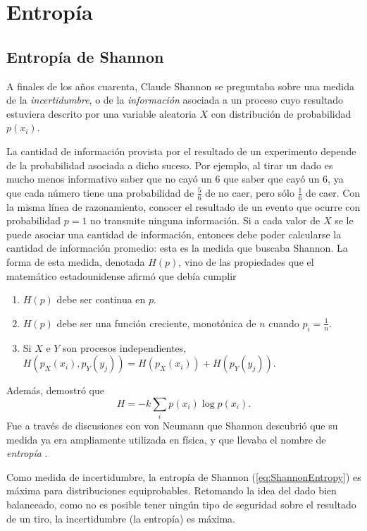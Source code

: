 \section{Entropía}
\subsection{Entropía de Shannon}
A finales de los años cuarenta, Claude Shannon se preguntaba sobre una medida de la \textit{incertidumbre}, o de la \textit{información} asociada a un proceso cuyo resultado estuviera descrito por una variable aleatoria $X$ con distribución de probabilidad $p(x_{i})$.


La cantidad de información provista por el resultado de un experimento depende de la probabilidad asociada a dicho suceso. Por ejemplo, al tirar un dado es mucho menos informativo saber que no cayó un $6$ que saber que cayó un $6$, ya que cada número tiene una probabilidad de $\frac{5}{6}$ de no caer, pero sólo $\frac{1}{6}$ de caer. Con la misma línea de razonamiento, conocer el resultado de un evento que ocurre con probabilidad $p=1$ no transmite ninguna información. Si a cada valor de $X$ se le puede asociar una cantidad de información, entonces debe poder calcularse la cantidad de información promedio: esta es la medida que buscaba Shannon. La forma de esta medida, denotada $H(p)$, vino de las propiedades que el matemático estadounidense afirmó que debía cumplir \cite{Shannon,Wilde}
\begin{enumerate}
    \item $H(p)$ debe ser continua en $p$.
    \item $H(p)$ debe ser una función creciente, monotónica de $n$ cuando $p_{i}=\frac{1}{n}$.
    \item Si $X$ e $Y$ son procesos independientes, $H(p_{X}(x_{i}),p_{Y}(y_{j}))=H(p_{X}(x_{i}))+H(p_{Y}(y_{j}))$.
\end{enumerate}
Además, demostró que
\begin{equation}\label{eq:ShannonEntropy}
    H=-k\sum_{i}p(x_{i})\log{p(x_{i})}.
\end{equation}
Fue a través de discusiones con von Neumann que Shannon descubrió que su medida ya era ampliamente utilizada en física, y que llevaba el nombre de \textit{entropía} \cite{McIrvine}.

Como medida de incertidumbre, la entropía de Shannon (\ref{eq:ShannonEntropy}) es máxima para distribuciones equiprobables. Retomando la idea del dado bien balanceado, como no es posible tener ningún tipo de seguridad sobre el resultado de un tiro, la incertidumbre (la entropía) es máxima.

